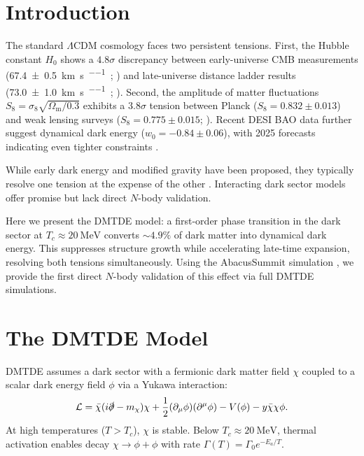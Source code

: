 \documentclass[aps,prd,twocolumn,superscriptaddress,nofootinbib,floatfix,preprintnumbers]{revtex4-2}
\newcommand{\DMTDE}{\textsc{DMTDE}\xspace}
\newcommand{\LCDM}{\ensuremath{\Lambda\text{CDM}}\xspace}
\newcommand{\Sz}{\ensuremath{S_8}}
\newcommand{\Om}{\ensuremath{\Omega_{\mathrm{m}}}}
\begin{document}
\vspace{1.5em}
\twocolumngrid  %


\section{Introduction}
\label{sec:intro}

The standard \LCDM cosmology faces two persistent tensions. First, the Hubble constant $H_0$ shows a $4.8\sigma$ discrepancy between early-universe CMB measurements (\SI{67.4 \pm 0.5}{\kilo\meter\per\second\per\mega\parsec}; \cite{planck2020}) and late-universe distance ladder results (\SI{73.0 \pm 1.0}{\kilo\meter\per\second\per\mega\parsec}; \cite{riess2022}). Second, the amplitude of matter fluctuations $\Sz = \sigma_8 \sqrt{\Om/0.3}$ exhibits a $3.8\sigma$ tension between Planck ($\Sz = 0.832 \pm 0.013$) and weak lensing surveys ($\Sz = 0.775 \pm 0.015$; \cite{heymans2021,DESI2022}). Recent DESI BAO data \citep{DESI2024} further suggest dynamical dark energy ($w_0 = -0.84 \pm 0.06$), with 2025 forecasts indicating even tighter constraints \citep{DESI2025}.

While early dark energy \citep{poulin2019} and modified gravity \citep{clifton2012} have been proposed, they typically resolve one tension at the expense of the other \citep{hill2020}. Interacting dark sector models \citep{wang2016} offer promise but lack direct $N$-body validation.

Here we present the \DMTDE model: a first-order phase transition in the dark sector at $T_c \approx \SI{20}{\MeV}$ converts $\sim 4.9\%$ of dark matter into dynamical dark energy. This suppresses structure growth while accelerating late-time expansion, resolving both tensions simultaneously. Using the AbacusSummit simulation \citep{garrison2021}, we provide the first direct $N$-body validation of this effect via full DMTDE simulations.

\section{The \DMTDE Model}
\label{sec:model}

\DMTDE assumes a dark sector with a fermionic dark matter field $\chi$ coupled to a scalar dark energy field $\phi$ via a Yukawa interaction:
\begin{equation}
\mathcal{L} = \bar{\chi}(i\slashed{\partial} - m_\chi)\chi + \frac{1}{2}(\partial_\mu\phi)(\partial^\mu\phi) - V(\phi) - y\bar{\chi}\chi\phi.
\end{equation}
At high temperatures ($T > T_c$), $\chi$ is stable. Below $T_c \approx \SI{20}{\MeV}$, thermal activation enables decay $\chi \to \phi + \phi$ with rate $\Gamma(T) = \Gamma_0 e^{-E_a/T}$.
\end{document}
